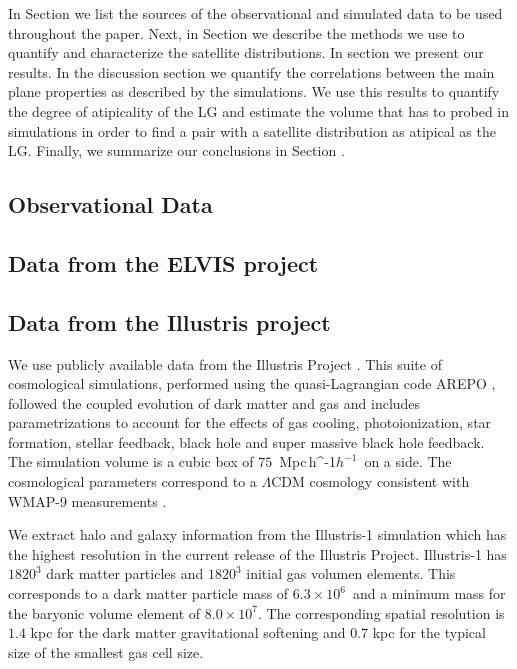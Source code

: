 \documentclass[a4paper,fleqn,usenatbib]{mnras}
\newcommand{\Mpch}{\,{\rm Mpc}\,\ifmmode h^{-1}\else $h^{-1}$\fi}
\newcommand{\Msun}{{\ifmmode{{\rm{M_{\odot}}}}\else{${\rm{M_{\odot}}}$}\fi}}
\begin{document}
In Section we list the sources of the observational and
simulated data to be used throughout the paper.
Next, in Section we describe the methods we use to quantify and
characterize the satellite distributions.
In section we present our results. 
In the discussion section we quantify the correlations between the main
plane properties as described by the simulations.
We use this results to quantify the degree of atipicality of the LG
and estimate the volume that has to probed in simulations in order to
find a pair with a satellite distribution as atipical as the LG. 
Finally, we summarize our conclusions in Section .

\label{Data Samples}

\subsection{Observational Data}
\label{sec:obs}



\subsection{Data from the ELVIS project}
\label{sim:ELVIS}

\subsection{Data from the Illustris project}
\label{sec:illustris}

We use publicly available data from the Illustris Project 
\citep{2014MNRAS.444.1518V}. 
This suite of cosmological simulations, performed using the quasi-Lagrangian
code AREPO \citep{2010MNRAS.401..791S}, followed the coupled evolution of dark 
matter and gas and includes parametrizations to account for the effects of
gas cooling, photoionization, star formation, stellar feedback, black
hole and super massive black hole feedback. 
The simulation volume is a cubic box of $75$ \Mpch\ on a side.
The cosmological parameters correspond to a $\Lambda$CDM cosmology
consistent with WMAP-9 measurements \citep{2013ApJS..208...19H}. 

We extract halo and galaxy information from the Illustris-1 simulation
which has the highest resolution in the current release of the
Illustris Project.
Illustris-1 has $1820^3$ dark matter particles and $1820^3$ initial gas
volumen elements. 
This corresponds to a dark matter particle mass of
$6.3\times 10^6$\Msun\ and a minimum mass for the baryonic volume
element of $8.0\times 10^7$\Msun. 
The corresponding spatial resolution is $1.4$ kpc for the dark matter
gravitational softening and $0.7$ kpc for the typical size of the
smallest gas cell size. 
\end{document}
